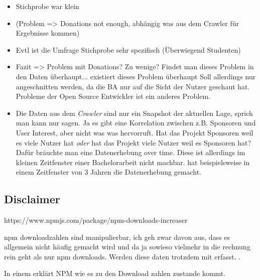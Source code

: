 \begin{itemize}
    \item Stichprobe war klein
    \item (Problem => Donations not enough, abhängig was aus dem Crawler für Ergebnisse kommen)
    \item Evtl ist die Umfrage Stichprobe sehr spezifisch (Überwiegend Studenten)
    \item Fazit => Problem mit Donations? Zu wenige?
          Findet man dieses Problem in den Daten überhaupt... existiert dieses Problem überhaupt
          Soll allerdings nur angeschnitten werden, da die BA nur auf die Sicht der Nutzer geschaut hat.
          Probleme der Open Source Entwickler ist ein anderes Problem.
    \item Die Daten aus dem \textit{Crawler} sind nur ein Snapshot der aktuellen Lage, sprich man kann
          nur sagen. Ja es gibt eine Korrelation zwischen z.B. Sponsoren und User Interest, aber nicht was was hervorruft.
          Hat das Projekt Sponsoren weil es viele Nutzer hat \textit{oder} hat das Projekt viele Nutzer weil es Sponsoren hat?
          Dafür bräuchte man eine Datenerhebung over time. 
          Diese ist allerdings im kleinen Zeitfenster einer Bachelorarbeit nicht machbar.
          \cite{midhaFactorsAffectingSuccess2012} hat beispielsweise in einem Zeitfenster von 3 Jahren die
          Datenerhebung gemacht. %
\end{itemize}


\subsection{Disclaimer}

https://www.npmjs.com/package/npm-downloads-increaser

npm downloadzahlen sind manipulierbar, ich geh zwar davon aus, dass es allgemein nicht häufig gemacht wird
und da ja sowieso vielmehr in die rechnung rein geht als nur npm downloads. Werden diese daten trotzdem mit erfasst.
.

In einem 
erklärt NPM wie es zu den Download zahlen zustande kommt.